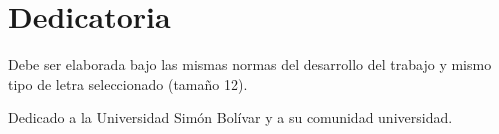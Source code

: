 \chapter*{\protect Dedicatoria}

Debe ser elaborada bajo las mismas normas del desarrollo del trabajo y mismo tipo de letra seleccionado (tama\~no 12).

\par Dedicado a la Universidad Sim\'on Bol\'ivar y a su comunidad universidad.
